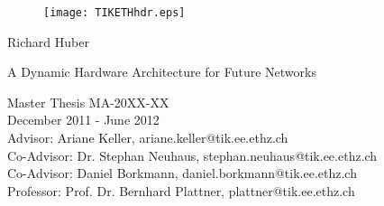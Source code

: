   \begin{titlepage}

  \begin{center}
  \begin{figure}[!t]
     \texttt{[image: TIKETHhdr.eps]}
  \end{figure}
  \end{center}

  \vspace{2 cm}
  
  \begin{center}
 

  {\large Richard Huber}
  \vspace{2 cm}


  {\Huge  A Dynamic Hardware Architecture for Future Networks}\\

  \vspace{\fill}

  Master Thesis MA-20XX-XX\\
  December 2011 - June 2012\\

  \vspace{1cm}
  Advisor: Ariane Keller, ariane.keller@tik.ee.ethz.ch\\
  Co-Advisor: Dr. Stephan Neuhaus, stephan.neuhaus@tik.ee.ethz.ch\\
  Co-Advisor: Daniel Borkmann, daniel.borkmann@tik.ee.ethz.ch\\
  Professor: Prof. Dr. Bernhard Plattner, plattner@tik.ee.ethz.ch\\
  \end{center}    
  \end{titlepage}
